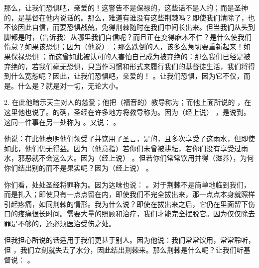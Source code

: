 那么，让我们恐惧吧，亲爱的！这警告不是保禄的，这些话不是人的；而是圣神的，是基督在他内说话的。那么，难道有谁没有这些荆棘吗？即使我们清除了，也不该因此自信，而要恐惧战兢，免得荆棘随时在我们中间长出来。但当我们从头到脚都是时，（告诉我）从哪里我们自信呢？而且正在变得麻木不仁？是什么使我们惰怠？如果该恐惧；因为（他说） ；那么跌倒的人，该多么急切要重新起来！如果保禄恐惧 ；而这曾如此被认可的人害怕自己成为被弃绝的：那么我们已经是被弃绝的，若我们毫无恐惧，只当作习惯和形式来履行我们的基督徒生活，我们将得到什么宽恕呢？因此，让我们恐惧吧，亲爱的！ 。让我们恐惧，因为它不仅，而是。什么是？就是对一切，无论大小。\par

2. 在此他暗示天主对人的慈爱；他把（福音的）教导称为；而他上面所说的 ，在这里他也说了。的确，圣经在许多地方将教导称为。因为（经上说） ，是说到。这同一件事在另一处称为 。又说： 。\par

他说：在此他表明他们领受了并饮用了圣言，是的，且多次享受了这雨水，但即使如此，他们仍无得益。因为（他意指）若你们未曾被耕耘，若你们没有享受过雨水，邪恶就不会这么大。因为（经上说） 。但若你们常常饮用并得（滋养），为何你们结出别的而不是果实呢？因为（经上说） 。\par

你们看，处处圣经将罪称为。因为达味也说： 。对于荆棘不是简单地临到我们，而是扎入；即使只有一点点留在内，即使我们不完全拔出来，那一点点本身就照样引起疼痛，如同荆棘的情形。我为什么说？即使在拔出来之后，它仍在里面留下伤口的疼痛很长时间。需要大量的照顾和治疗，我们才能完全摆脱它。因为仅仅除去罪是不够的，还必须医治受伤之处。\par

但我担心所说的话适用于我们更甚于别人。因为他说：我们常常饮用，常常聆听，但 ，我们立刻就失去了水分，因此结出荆棘来。那么荆棘是什么呢？让我们听基督说： 。\par

